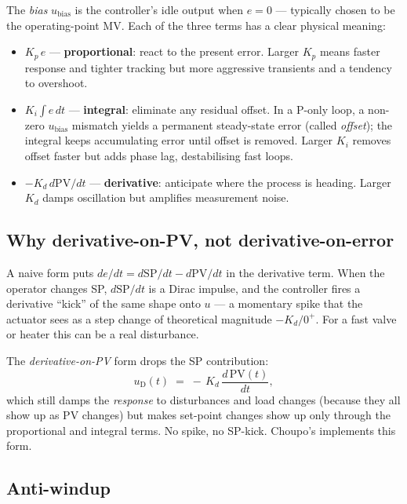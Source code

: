 \documentclass[11pt,a4paper]{article}
\begin{document}
The \emph{bias} $u_{\mathrm{bias}}$ is the controller's idle output
when $e = 0$ — typically chosen to be the operating-point MV.  Each
of the three terms has a clear physical meaning:

\begin{itemize}
\item $K_p\,e$ — \textbf{proportional}: react to the present
      error.  Larger $K_p$ means faster response and tighter
      tracking but more aggressive transients and a tendency to
      overshoot.
\item $K_i\!\int e\,dt$ — \textbf{integral}: eliminate any
      residual offset.  In a P-only loop, a non-zero $u_{\mathrm{bias}}$
      mismatch yields a permanent steady-state error (called
      \emph{offset}); the integral keeps accumulating error until
      offset is removed.  Larger $K_i$ removes offset faster but
      adds phase lag, destabilising fast loops.
\item $-K_d\,d\mathrm{PV}/dt$ — \textbf{derivative}: anticipate
      where the process is heading.  Larger $K_d$ damps oscillation
      but amplifies measurement noise.
\end{itemize}

\subsection*{Why derivative-on-PV, not derivative-on-error}

A naive form puts $de/dt = d\mathrm{SP}/dt - d\mathrm{PV}/dt$ in the
derivative term.  When the operator changes SP, $d\mathrm{SP}/dt$ is
a Dirac impulse, and the controller fires a derivative ``kick'' of
the same shape onto $u$ --- a momentary spike that the actuator
sees as a step change of theoretical magnitude $-K_d / 0^+$.  For a
fast valve or heater this can be a real disturbance.

The \emph{derivative-on-PV} form drops the SP contribution:
\[
    u_{\mathrm{D}}(t) \;=\; -\,K_d \, \frac{d\,\mathrm{PV}(t)}{dt},
\]
which still damps the \emph{response} to disturbances and load
changes (because they all show up as $\mathrm{PV}$ changes) but
makes set-point changes show up only through the proportional and
integral terms.  No spike, no SP-kick.  Choupo's
 implements this form.

\subsection*{Anti-windup}
\end{document}
